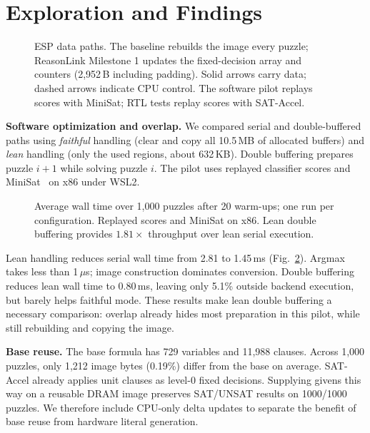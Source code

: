 \documentclass[conference,10pt,letterpaper]{IEEEtran}
\begin{document}
\section{Exploration and Findings}
\begin{figure}[t]
\centering
\resizebox{\textwidth}{!}{}
\caption{ESP data paths. The baseline rebuilds the image every puzzle; ReasonLink Milestone 1 updates the fixed-decision array and counters (2,952\,B including padding). Solid arrows carry data; dashed arrows indicate CPU control. The software pilot replays scores with MiniSat; RTL tests replay scores with SAT-Accel.}
\label{fig:handoff-paths}
\end{figure}

\textbf{Software optimization and overlap.} We compared serial and double-buffered paths using \emph{faithful} handling (clear and copy all 10.5\,MB of allocated buffers) and \emph{lean} handling (only the used regions, about 632\,KB). Double buffering prepares puzzle $i{+}1$ while solving puzzle $i$. The pilot uses replayed classifier scores and MiniSat~\cite{minisat} on x86 under WSL2.

\begin{figure}[t]
\centering

\caption{Average wall time over 1,000 puzzles after 20 warm-ups; one run per configuration. Replayed scores and MiniSat on x86. Lean double buffering provides $1.81\times$ throughput over lean serial execution.}
\label{fig:pilot}
\end{figure}

Lean handling reduces serial wall time from 2.81 to 1.45\,ms (Fig.~\ref{fig:pilot}). Argmax takes less than 1\,$\mu$s; image construction dominates conversion. Double buffering reduces lean wall time to 0.80\,ms, leaving only 5.1\% outside backend execution, but barely helps faithful mode. These results make lean double buffering a necessary comparison: overlap already hides most preparation in this pilot, while still rebuilding and copying the image.

\textbf{Base reuse.} The base formula has 729 variables and 11,988 clauses. Across 1,000 puzzles, only 1,212 image bytes (0.19\%) differ from the base on average. SAT-Accel already applies unit clauses as level-0 fixed decisions. Supplying givens this way on a reusable DRAM image preserves SAT/UNSAT results on 1000/1000 puzzles. We therefore include CPU-only delta updates to separate the benefit of base reuse from hardware literal generation.
\end{document}
